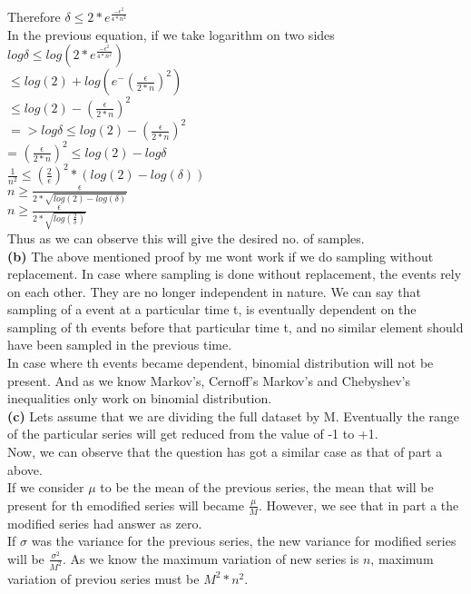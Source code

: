 \documentclass[11pt]{article}
\renewcommand\part[1]{\vspace{.10in}\textbf{(#1)}}
\begin{document}
Therefore $\delta \leq 2 * e^ {\frac{-\epsilon ^ 2}{4 * n^2}}$\\
In the previous equation, if we take logarithm on two sides\\
$log\delta \leq log(2 * e^ {\frac{-\epsilon ^ 2}{4 * n^2}})$\\
$\leq log(2) + log(e^-({\frac{\epsilon}{2 * n}})^2)$\\
$\leq log(2) -({\frac{\epsilon}{2 * n}})^2$\\
$=> log\delta \leq log(2)  -({\frac{\epsilon}{2 * n}})^2$\\
= $({\frac{\epsilon}{2 * n}})^2 \leq log(2) - log\delta$\\
$\frac{1}{n^2} \leq (\frac{2}{\epsilon}) ^2 * (log(2) - log(\delta))$\\
$n \geq \frac{\epsilon}{2 * \sqrt{log(2)- log(\delta)}}$\\
$n \geq \frac{\epsilon}{2 * \sqrt{log(\frac{2}{\delta})}}$\\
Thus as we can observe this will give the desired no. of samples.\\

\part{b}
The above mentioned proof by me wont work if we do sampling without replacement. In case where sampling is done without replacement, the events rely on each other. They are no longer independent in nature. We can say that sampling of a event at a particular time t, is eventually dependent on the sampling of th events before that particular time t, and no similar element should have been sampled in the previous time.\\
In case where th events became dependent, binomial distribution will not be present. And as we know Markov's, Cernoff's Markov's and Chebyshev's inequalities only work on binomial distribution.\\

\part{c}
Lets assume that we are dividing the full dataset by M. Eventually the range of the particular series will get reduced from the value of -1 to +1.\\ 
Now, we can observe that the question has got a similar case as that of part a above.\\
If we consider $\mu$ to be the mean of the previous series, the mean that will be present for th emodified series will became $\frac{\mu}{M}$. However, we see that in part a the modified series had answer as zero.\\
If $\sigma$ was the variance for the previous series, the new variance for modified series will be $\frac{\sigma ^2}{M^2}$. As we know the maximum variation of new series is $n$, maximum variation of previou series must be $M^2 * n^2$.\\
\end{document}
